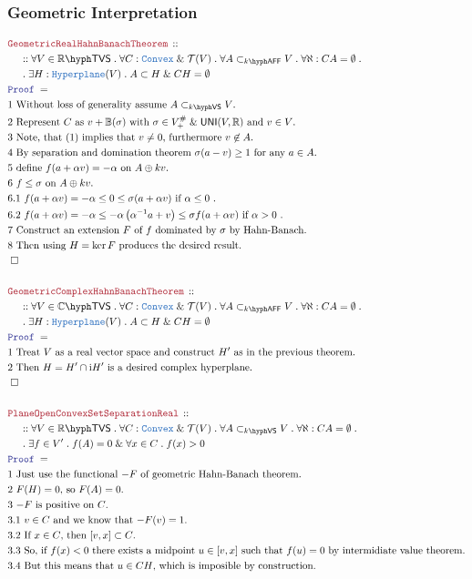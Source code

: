 \documentclass[12pt]{scrartcl}
\newcommand{\TYPE}[1]{\textcolor{NavyBlue}{\mathtt{#1}}}
\newcommand{\LOGIC}[1]{\textcolor{Blue}{\mathtt{#1}}}
\newcommand{\THM}[1]{\textcolor{Maroon}{\mathtt{#1}}}
\renewcommand{\.}{\; . \;}
\newcommand{\Theorem}[2]{& \THM{#1} \, :: \, #2 \\ & \Proof = \\ }
\newcommand{\NewLine}{\\ & \kern 1pc}
\newcommand{\Page}[1]{ \begin{align*} #1 \end{align*}   }
\newcommand{\Explain}[1]{& \text{#1.} \\}
\renewcommand{\And}{\; \& \;}
\newcommand{\Reals}{\mathbb{R} }
\newcommand{\Complex}{\mathbb{C}}
\renewcommand{\i}{\mathrm{i}}
\newcommand{\QED}{\; \square}
\newcommand{\EndProof}{& \QED \\}
\newcommand{\Proof}{\LOGIC{Proof} \; }
\newcommand{\T}{\mathcal{T}}
\newcommand{\Cell}{\mathbb{B}}
\newcommand{\UNI}{\mathsf{UNI}}
\newcommand{\subvec}[1]{\subset_{\VS{#1}}}%
\newcommand{\VS}[1]{#1\hyph\mathsf{VS}} %
\newcommand{\Convex}{\TYPE{Convex}}
\newcommand{\TVS}[1]{{#1}\hyph\mathsf{TVS}}
\begin{document}
\subsubsection{Geometric Interpretation}
\Page{
	\Theorem{GeometricRealHahnBanachTheorem}
	{
		\NewLine :: 		
		\forall V \in \TVS{\Reals} \.
		\forall C : \Convex \And \T(V) \.
		\forall A \subset_{k\hyph\mathsf{AFF}} V \.
		\forall \aleph : CA = \emptyset \. \NewLine \.
		\exists H : \TYPE{Hyperplane}(V) \.
		A \subset H \And CH = \emptyset
	}
	\Explain{1 Without loss of generality assume $A \subvec{k} V$}
	\Explain{2 Represent $C$ as $v + \Cell(\sigma)$ with $\sigma \in V^\#_+ \And \UNI(V,\Reals)$ 
		and $v \in V$}
	\Explain{3 Note, that (1) implies that $v \neq 0$, furthermore $v \not \in A$}
	\Explain{4  By separation and domination theorem $\sigma(a - v) \ge 1$ for any $a \in A$}
	\Explain{5 define $f(a + \alpha v) = - \alpha$ on $A \oplus kv$}
	\Explain{6 $f \le \sigma$ on $A \oplus kv$}
	\Explain{6.1 $f(a + \alpha v) = - \alpha \le 0 \le \sigma(a + \alpha v)$ if $\alpha \le 0$ }
	\Explain{6.2 $f(a + \alpha v) = - \alpha \le -\alpha\left( \alpha^{-1} a + v\right) 
			\le \sigma f(a + \alpha v) $ if $\alpha > 0$ }
	\Explain{7 Construct an extension $F$ of $f$ dominated by $\sigma$ by Hahn-Banach}
	\Explain{8 Then using $H = \ker F$ produces the desired result}
	\EndProof
	\\
	\Theorem{GeometricComplexHahnBanachTheorem}
	{
		\NewLine :: 		
		\forall V \in \TVS{\Complex} \.
		\forall C : \Convex \And \T(V) \.
		\forall A \subset_{k\hyph\mathsf{AFF}} V \.
		\forall \aleph : CA = \emptyset \. \NewLine \.
		\exists H : \TYPE{Hyperplane}(V) \.
		A \subset H \And CH = \emptyset
	}
	\Explain{1 Treat $V$ as a real vector space and construct $H'$ as in the previous theorem}
	\Explain{2 Then $H = H' \cap \i H'$ is a desired complex hyperplane}
	\EndProof
	\\
	\Theorem{PlaneOpenConvexSetSeparationReal}
	{
		\NewLine ::
		\forall V \in \TVS{\Reals} \.
		\forall C : \Convex \And \T(V) \.
		\forall A \subvec{k} V \.
		\forall \aleph : CA = \emptyset \. \NewLine \.
		\exists f \in V' \. f(A) = 0 \And \forall x \in C \. f(x) > 0 
	}
	\Explain{1 Just use the functional $-F$ of geometric Hahn-Banach theorem}
	\Explain{2 $F(H) = 0$, so $F(A) = 0$}
	\Explain{3 $-F$ is positive on $C$}
	\Explain{3.1 $v \in C$ and we know that  $-F(v) = 1$}
	\Explain{3.2 If $x \in C$, then $[v,x] \subset C$}
	\Explain{3.3 So, if $f(x) < 0$ there exists a midpoint $u \in [v,x]$ such that $f(u) = 0$
		by intermidiate value theorem}
	\Explain{3.4 But this means that $u \in CH$, which is imposible by construction}
}
\end{document}
